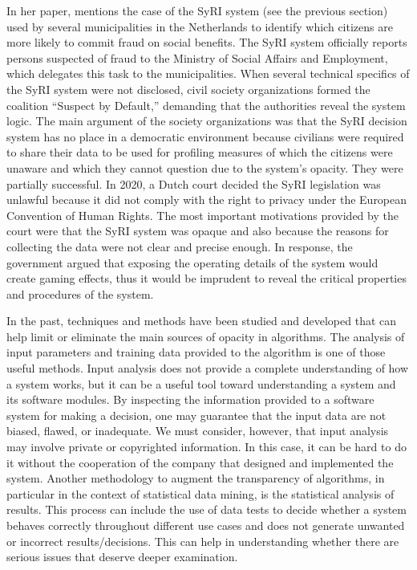 In her paper, \citet{chap:10:Wieringa:2020} mentions the case of the SyRI system (see the previous section) used by several municipalities in the Netherlands to identify which citizens are more likely to commit fraud on social benefits. The SyRI system officially reports persons suspected of fraud to the Ministry of Social Affairs and Employment, which delegates this task to the municipalities. When several technical specifics of the SyRI system were not disclosed, civil society organizations formed the coalition ``Suspect by Default,'' demanding that the authorities reveal the system logic. The main\vadjust{\vspace*{12pt}\pagebreak} argument of the society organizations was that the SyRI decision system has no place in a democratic environment because civilians were required to share their data to be used for profiling measures of which the citizens were unaware and which they cannot question due to the system's opacity. They were partially successful. In 2020, a Dutch court decided the SyRI legislation was unlawful because it did not comply with the right to privacy under the \hbox{European} Convention of Human Rights. The most important motivations provided by the court were that the SyRI system was opaque and also because the reasons for collecting the data were not clear and precise enough. In response, the government argued that exposing the operating details of the system would \hbox{create} gaming effects, thus it would be imprudent to reveal the critical properties and procedures of the system.

In the past, techniques and methods have been studied and developed that can help limit or eliminate the main sources of opacity in algorithms. The analysis of input parameters and training data provided to the algorithm is one of those \hbox{useful} methods. Input analysis does not provide a complete understanding of how a system works, but it can be a useful tool toward understanding a system and its software modules. By inspecting the information provided to a software \hbox{system} for making a decision, one may guarantee that the input data are not biased, flawed, or inadequate. We must consider, however, that input analysis may involve private or copyrighted information. In this case, it can be hard to do it without the cooperation of the company that designed and implemented the system. Another methodology to augment the transparency of algorithms, in particular in the context of statistical data mining, is the statistical analysis of results. This process can include the use of data tests to decide whether a system behaves correctly throughout different use cases and does not generate unwanted or incorrect results/decisions. This can help in understanding whether there are serious issues that deserve deeper examination.

